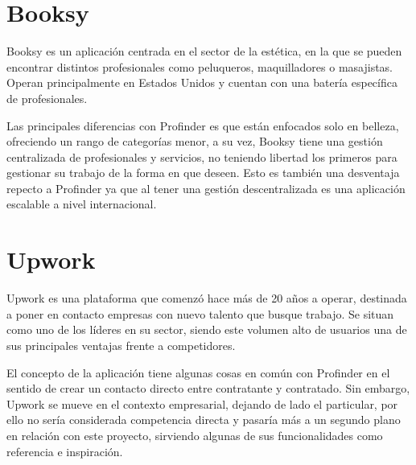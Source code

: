 \section{Booksy}
Booksy\hyperlink{cap:biblio}{}
es un aplicación centrada en el sector de la estética, en la que se pueden encontrar distintos profesionales como peluqueros, maquilladores o masajistas. Operan principalmente en Estados Unidos y cuentan con una batería específica de profesionales.

Las principales diferencias con Profinder es que están enfocados solo en belleza, ofreciendo un rango de categorías menor, a su vez, Booksy tiene una gestión centralizada de profesionales y servicios, no teniendo libertad los primeros para gestionar su trabajo de la forma en que deseen. Esto es también una desventaja repecto a Profinder ya que al tener una gestión descentralizada es una aplicación escalable a nivel internacional. 
\newpage
\section{Upwork}

Upwork\hyperlink{cap:biblio}{}
es una plataforma que comenzó hace más de 20 años a operar, destinada a poner en contacto empresas con nuevo talento que busque trabajo. Se situan como uno de los líderes en su sector, siendo este volumen alto de usuarios una de sus principales ventajas frente a competidores.

El concepto de la aplicación tiene algunas cosas en común con Profinder en el sentido de crear un contacto directo entre contratante y contratado. Sin embargo, Upwork se mueve en el contexto empresarial, dejando de lado el particular, por ello no sería considerada competencia directa y pasaría más a un segundo plano en relación con este proyecto, sirviendo algunas de sus funcionalidades como referencia e inspiración.







